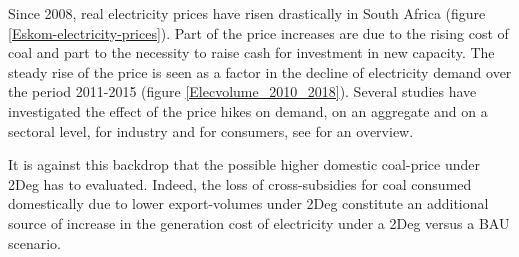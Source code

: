 \documentclass[12pt,english]{article}
\begin{document}
Since 2008, real electricity prices have risen drastically in South Africa (figure \ref{Eskom-electricity-prices}). Part of the price increases are due to the rising cost of coal and part to the necessity to raise cash for investment in new capacity. The steady rise of the price is seen as a factor in the decline of electricity demand over the period 2011-2015 (figure \ref{Elecvolume_2010_2018}). Several studies have investigated the effect of the price hikes on demand, on an aggregate and on a sectoral level, for industry and for consumers, see \cite{goliger2018electricity} for an overview.


It is against this backdrop that the possible higher domestic coal-price under 2Deg has to evaluated. Indeed, the loss of cross-subsidies for coal consumed domestically due to lower export-volumes under 2Deg constitute an additional source of increase in the generation cost of electricity under a 2Deg versus a BAU scenario.



%
%
%
%

%
%
\end{document}
